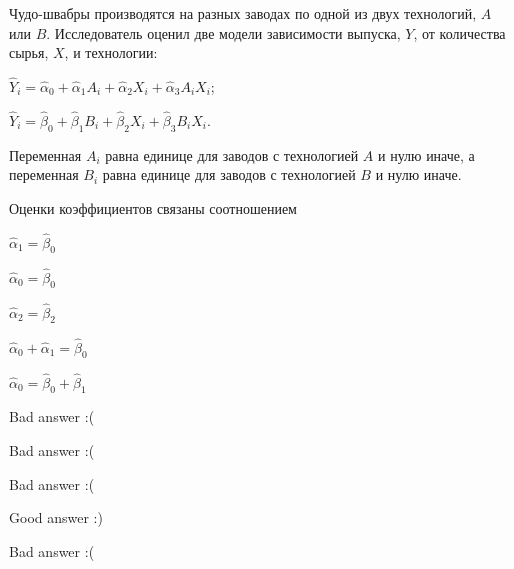 
\begin{question}
Чудо-швабры производятся на разных заводах по одной из двух технологий, \(A\) или \(B\).
Исследователь оценил две модели зависимости выпуска, \(Y\), от количества сырья, \(X\), и технологии:

\(\hat Y_i = \hat \alpha_0 + \hat\alpha_1 A_i + \hat\alpha_2 X_i + \hat\alpha_3 A_i X_i\);

\(\hat Y_i = \hat \beta_0 + \hat\beta_1 B_i + \hat\beta_2 X_i + \hat\beta_3 B_i X_i\).

Переменная \(A_i\) равна единице для заводов с технологией \(A\) и нулю иначе, а переменная \(B_i\) равна единице для
заводов с технологией \(B\) и нулю иначе.

Оценки коэффициентов связаны соотношением
\begin{answerlist}
  \item \(\hat\alpha_1 = \hat\beta_0\)
  \item \(\hat\alpha_0  = \hat\beta_0\)
  \item \(\hat\alpha_2 = \hat\beta_2\)
  \item \(\hat\alpha_0 + \hat\alpha_1 = \hat\beta_0\)
  \item \(\hat\alpha_0 = \hat\beta_0 + \hat\beta_1\)
\end{answerlist}
\end{question}

\begin{solution}
\begin{answerlist}
  \item Bad answer :(
  \item Bad answer :(
  \item Bad answer :(
  \item Good answer :)
  \item Bad answer :(
\end{answerlist}
\end{solution}

